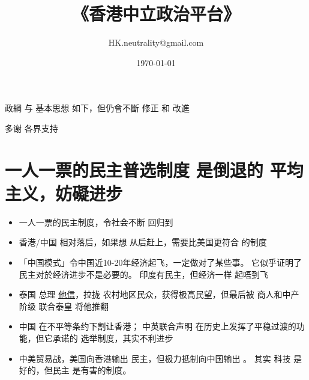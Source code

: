 \title{\bfseries\color{blue} \Huge《香港中立政治平台》}
\author{HK.neutrality@gmail.com}
\date{\today} %

\maketitle

\tableofcontents

政綱 与 基本思想 如下，但仍會不斷 修正 和 改進

多谢 各界支持 \smiley


\section{一人一票的民主普选制度 是倒退的 平均主义，妨礙进步}
\begin{itemize}
	\item 一人一票的民主制度，令社会不断 回归到 
	
	\item 香港/中国 相对落后，如果想 从后赶上，需要比美国更符合  的制度
	
	\item 「中国模式」令中国近10-20年经济起飞，一定做对了某些事。 它似乎证明了民主对於经济进步不是必要的。 印度有民主，但经济一样 起唔到飞

	\item 泰国 总理 \underline{他信}，拉拢 农村地区民众，获得极高民望，但最后被 商人和中产阶级 联合泰皇 将他推翻

	\item 中国 在不平等条约下割让香港； 中英联合声明 在历史上发挥了平稳过渡的功能，但它承诺的 选举制度，其实不利进步
	
	\item 中美贸易战，美国向香港输出 民主，但极力抵制向中国输出 。 其实 科技 是好的，但民主 是有害的制度。 
\end{itemize}



